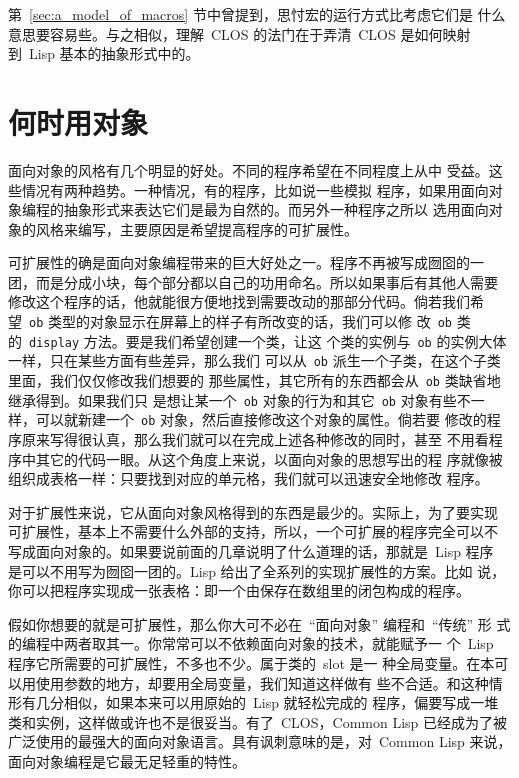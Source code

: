 第~\ref{sec:a_model_of_macros} 节中曾提到，思忖宏的运行方式比考虑它们是
什么意思要容易些。与之相似，理解~CLOS 的法门在于弄清~CLOS 是如何映射
到~Lisp 基本的抽象形式中的。

\section{何时用对象}
\label{sec:when_to_object}

面向对象的风格有几个明显的好处。不同的程序希望在不同程度上从中
受益。这些情况有两种趋势。一种情况，有的程序，比如说一些模拟
程序，如果用面向对象编程的抽象形式来表达它们是最为自然的。而另外一种程序之所以
选用面向对象的风格来编写，主要原因是希望提高程序的可扩展性。

可扩展性的确是面向对象编程带来的巨大好处之一。程序不再被写成囫囵的一
团，而是分成小块，每个部分都以自己的功用命名。所以如果事后有其他人需要
修改这个程序的话，他就能很方便地找到需要改动的那部分代码。倘若我们希
望~\texttt{ob} 类型的对象显示在屏幕上的样子有所改变的话，我们可以修
改~\texttt{ob} 类的~\texttt{display} 方法。要是我们希望创建一个类，让这
个类的实例与~\texttt{ob} 的实例大体一样，只在某些方面有些差异，那么我们
可以从~\texttt{ob} 派生一个子类，在这个子类里面，我们仅仅修改我们想要的
那些属性，其它所有的东西都会从~\texttt{ob} 类缺省地继承得到。如果我们只
是想让某一个~\texttt{ob} 对象的行为和其它~\texttt{ob} 对象有些不一 
样，可以就新建一个~\texttt{ob} 对象，然后直接修改这个对象的属性。倘若要
修改的程序原来写得很认真，那么我们就可以在完成上述各种修改的同时，甚至
不用看程序中其它的代码一眼。从这个角度上来说，以面向对象的思想写出的程
序就像被组织成表格一样：只要找到对应的单元格，我们就可以迅速安全地修改
程序。

对于扩展性来说，它从面向对象风格得到的东西是最少的。实际上，为了要实现
可扩展性，基本上不需要什么外部的支持，所以，一个可扩展的程序完全可以不
写成面向对象的。如果要说前面的几章说明了什么道理的话，那就是~Lisp 程序
是可以不用写为囫囵一团的。Lisp 给出了全系列的实现扩展性的方案。比如
说，你可以把程序实现成一张表格：即一个由保存在数组里的闭包构成的程序。

假如你想要的就是可扩展性，那么你大可不必在~``面向对象'' 编程和~``传统'' 形
式的编程中两者取其一。你常常可以不依赖面向对象的技术，就能赋予一
个~Lisp 程序它所需要的可扩展性，不多也不少。属于类的~slot 是一
种全局变量。在本可以用使用参数的地方，却要用全局变量，我们知道这样做有
些不合适。和这种情形有几分相似，如果本来可以用原始的~Lisp 就轻松完成的
程序，偏要写成一堆类和实例，这样做或许也不是很妥当。有了~CLOS，Common
Lisp 已经成为了被广泛使用的最强大的面向对象语言。具有讽刺意味的是，对~Common
Lisp 来说，面向对象编程是它最无足轻重的特性。


